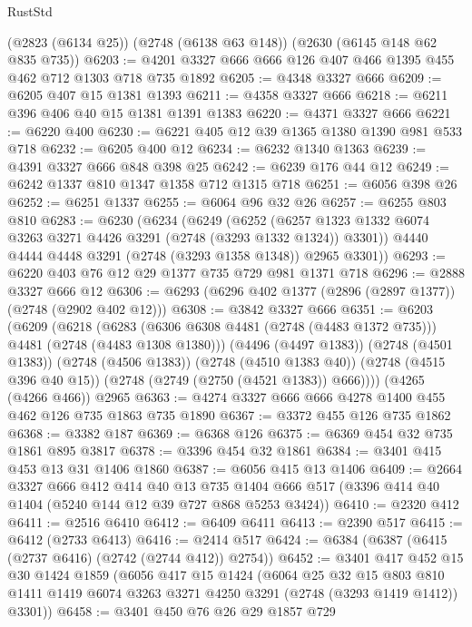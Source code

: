 \begin{lexlean}{RustStd}
\begin{coremodule}
    (@2823 (@6134 @25))
    (@2748 (@6138 @63 @148))
    (@2630 (@6145 @148 @62 @835 @735))
@6203 := @4201 @3327 @666 @666 @126 @407 @466 @1395 @455 @462 @712 @1303 @718 @735 @1892
@6205 := @4348 @3327 @666
@6209 := @6205 @407 @15 @1381 @1393
@6211 := @4358 @3327 @666
@6218 := @6211 @396 @406 @40 @15 @1381 @1391 @1383
@6220 := @4371 @3327 @666
@6221 := @6220 @400
@6230 := @6221 @405 @12 @39 @1365 @1380 @1390 @981 @533 @718
@6232 := @6205 @400 @12
@6234 := @6232 @1340 @1363
@6239 := @4391 @3327 @666 @848 @398 @25
@6242 := @6239 @176 @44 @12
@6249 := @6242 @1337 @810 @1347 @1358 @712 @1315 @718
@6251 := @6056 @398 @26
@6252 := @6251 @1337
@6255 := @6064 @96 @32 @26
@6257 := @6255 @803 @810
@6283 := @6230
    (@6234
      (@6249
        (@6252 (@6257 @1323 @1332 @6074 @3263 @3271 @4426 @3291 (@2748 (@3293 @1332 @1324)) @3301))
        @4440
        @4444
        @4448
        @3291
        (@2748 (@3293 @1358 @1348))
        @2965
        @3301))
@6293 := @6220 @403 @76 @12 @29 @1377 @735 @729 @981 @1371 @718
@6296 := @2888 @3327 @666 @12
@6306 := @6293 (@6296 @402 @1377 (@2896 (@2897 @1377)) (@2748 (@2902 @402 @12)))
@6308 := @3842 @3327 @666
@6351 := @6203
    (@6209
      (@6218
        (@6283 (@6306 @6308 @4481 (@2748 (@4483 @1372 @735))) @4481 (@2748 (@4483 @1308 @1380)))
        (@4496 (@4497 @1383))
        (@2748 (@4501 @1383))
        (@2748 (@4506 @1383))
        (@2748 (@4510 @1383 @40))
        (@2748 (@4515 @396 @40 @15))
        (@2748 (@2749 (@2750 (@4521 @1383)) @666))))
    (@4265 (@4266 @466))
    @2965
@6363 := @4274 @3327 @666 @666 @4278 @1400 @455 @462 @126 @735 @1863 @735 @1890
@6367 := @3372 @455 @126 @735 @1862
@6368 := @3382 @187
@6369 := @6368 @126
@6375 := @6369 @454 @32 @735 @1861 @895 @3817
@6378 := @3396 @454 @32 @1861
@6384 := @3401 @415 @453 @13 @31 @1406 @1860
@6387 := @6056 @415 @13 @1406
@6409 := @2664
    @3327
    @666
    @412
    @414
    @40
    @13
    @735
    @1404
    @666
    @517
    (@3396 @414 @40 @1404 (@5240 @144 @12 @39 @727 @868 @5253 @3424))
@6410 := @2320 @412
@6411 := @2516 @6410
@6412 := @6409 @6411
@6413 := @2390 @517
@6415 := @6412 (@2733 @6413)
@6416 := @2414 @517
@6424 := @6384 (@6387 (@6415 (@2737 @6416) (@2742 (@2744 @412)) @2754))
@6452 := @3401
    @417
    @452
    @15
    @30
    @1424
    @1859
    (@6056
      @417
      @15
      @1424
      (@6064
        @25
        @32
        @15
        @803
        @810
        @1411
        @1419
        @6074
        @3263
        @3271
        @4250
        @3291
        (@2748 (@3293 @1419 @1412))
        @3301))
@6458 := @3401 @450 @76 @26 @29 @1857 @729

\end{coremodule}
\end{lexlean}
